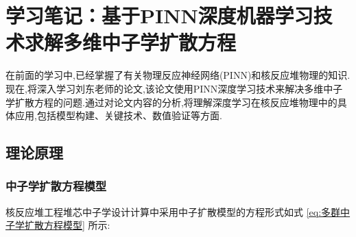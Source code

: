 \documentclass{Sichuan Normal University}
\begin{document}
\section{学习笔记：基于PINN深度机器学习技术求解多维中子学扩散方程}
在前面的学习中,已经掌握了有关物理反应神经网络(PINN)和核反应堆物理的知识.现在,将深入学习刘东老师的论文,该论文使用PINN深度学习技术来解决多维中子学扩散方程的问题.通过对论文内容的分析,将理解深度学习在核反应堆物理中的具体应用,包括模型构建、关键技术、数值验证等方面.
\subsection{理论原理}
\subsubsection{中子学扩散方程模型}
核反应堆工程堆芯中子学设计计算中采用中子扩散模型的方程形式如式 \eqref{eq:多群中子学扩散方程模型} 所示:
\end{document}
